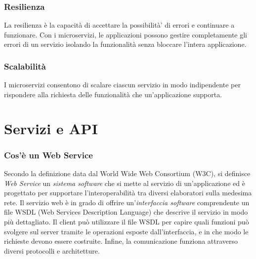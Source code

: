 \subsubsection{Resilienza}
La resilienza è la capacità di accettare la possibilità’ di errori e continuare a funzionare. Con i microservizi, le applicazioni possono gestire completamente gli errori di un servizio isolando la funzionalità senza bloccare l’intera applicazione.

\subsubsection{Scalabilità}
I microservizi consentono di scalare ciascun servizio in modo indipendente per rispondere alla richiesta delle funzionalità che un'applicazione supporta. 


\section{Servizi e API}

\subsubsection{Cos'è un Web Service}
Secondo la definizione data dal World Wide Web Consortium (W3C), si definisce \emph{Web Service} un \emph{sistema software} che si mette al servizio di un'applicazione ed è progettato per supportare l'interoperabilità tra diversi elaboratori sulla medesima rete. \cite{w3c:webservices} Il servizio web è in grado di offrire un’\textit{interfaccia software} comprendente un file WSDL (Web Services Description Language) che descrive il servizio in modo più dettagliato. Il client può utilizzare il file WSDL per capire quali funzioni può svolgere sul server tramite le operazioni esposte dall'interfaccia, e in che modo le richieste devono essere costruite. Infine, la comunicazione funziona attraverso diversi protocolli e architetture. 

